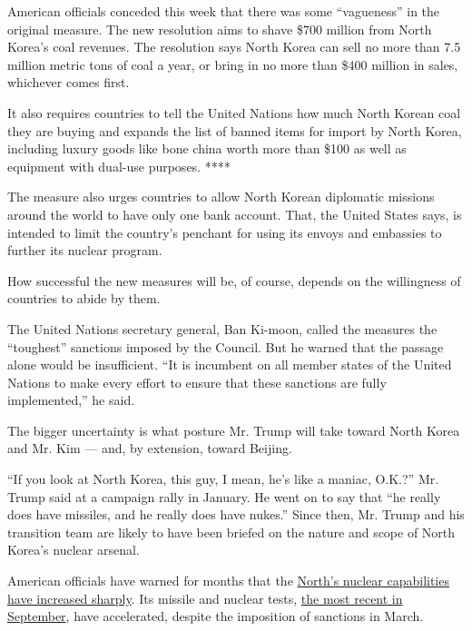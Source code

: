 American officials conceded this week that there was some ``vagueness''
in the original measure. The new resolution aims to shave \$700 million
from North Korea's coal revenues. The resolution says North Korea can
sell no more than 7.5 million metric tons of coal a year, or bring in no
more than \$400 million in sales, whichever comes first.

It also requires countries to tell the United Nations how much North
Korean coal they are buying and expands the list of banned items for
import by North Korea, including luxury goods like bone china worth more
than \$100 as well as equipment with dual-use purposes. ****

The measure also urges countries to allow North Korean diplomatic
missions around the world to have only one bank account. That, the
United States says, is intended to limit the country's penchant for
using its envoys and embassies to further its nuclear program.

How successful the new measures will be, of course, depends on the
willingness of countries to abide by them.

The United Nations secretary general, Ban Ki-moon, called the measures
the ``toughest'' sanctions imposed by the Council. But he warned that
the passage alone would be insufficient. ``It is incumbent on all member
states of the United Nations to make every effort to ensure that these
sanctions are fully implemented,'' he said.

The bigger uncertainty is what posture Mr. Trump will take toward North
Korea and Mr. Kim --- and, by extension, toward Beijing.

``If you look at North Korea, this guy, I mean, he's like a maniac,
O.K.?'' Mr. Trump said at a campaign rally in January. He went on to say
that ``he really does have missiles, and he really does have nukes.''
Since then, Mr. Trump and his transition team are likely to have been
briefed on the nature and scope of North Korea's nuclear arsenal.

American officials have warned for months that the
\href{http://www.nytimes3xbfgragh.onion/2016/05/07/world/asia/north-korea-nuclear-us-strategy.html}{North's
nuclear capabilities have increased sharply}. Its missile and nuclear
tests,
\href{http://www.nytimes3xbfgragh.onion/2016/09/09/world/asia/north-korea-nuclear-test.html?action=click\&contentCollection=Asia\%20Pacific\&module=RelatedCoverage\&region=Marginalia\&pgtype=article}{the
most recent in September}, have accelerated, despite the imposition of
sanctions in March.

